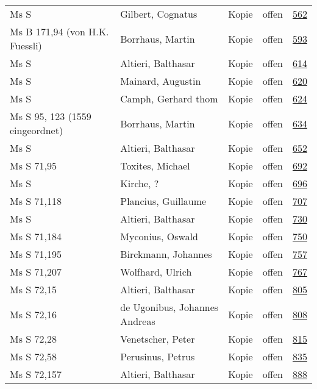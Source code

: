 \documentclass[10pt,a4paper,landscape]{report}
\begin{document}
\begin{longtable}{p{16cm}p{4cm}llr}
Ms S	&	Gilbert, Cognatus	&	Kopie	&	offen	&	\href{http://130.60.24.72/assignment/562}{562}\\
Ms B 171,94 (von H.K. Fuessli)	&	Borrhaus, Martin	&	Kopie	&	offen	&	\href{http://130.60.24.72/assignment/593}{593}\\
Ms S	&	Altieri, Balthasar	&	Kopie	&	offen	&	\href{http://130.60.24.72/assignment/614}{614}\\
Ms S	&	Mainard, Augustin	&	Kopie	&	offen	&	\href{http://130.60.24.72/assignment/620}{620}\\
Ms S	&	Camph, Gerhard thom	&	Kopie	&	offen	&	\href{http://130.60.24.72/assignment/624}{624}\\
Ms S 95, 123 (1559 eingeordnet)	&	Borrhaus, Martin	&	Kopie	&	offen	&	\href{http://130.60.24.72/assignment/634}{634}\\
Ms S	&	Altieri, Balthasar	&	Kopie	&	offen	&	\href{http://130.60.24.72/assignment/652}{652}\\
Ms S 71,95	&	Toxites, Michael	&	Kopie	&	offen	&	\href{http://130.60.24.72/assignment/692}{692}\\
Ms S	&	Kirche, ?	&	Kopie	&	offen	&	\href{http://130.60.24.72/assignment/696}{696}\\
Ms S 71,118	&	Plancius, Guillaume	&	Kopie	&	offen	&	\href{http://130.60.24.72/assignment/707}{707}\\
Ms S	&	Altieri, Balthasar	&	Kopie	&	offen	&	\href{http://130.60.24.72/assignment/730}{730}\\
Ms S 71,184	&	Myconius, Oswald	&	Kopie	&	offen	&	\href{http://130.60.24.72/assignment/750}{750}\\
Ms S 71,195	&	Birckmann, Johannes	&	Kopie	&	offen	&	\href{http://130.60.24.72/assignment/757}{757}\\
Ms S 71,207	&	Wolfhard, Ulrich	&	Kopie	&	offen	&	\href{http://130.60.24.72/assignment/767}{767}\\
Ms S 72,15	&	Altieri, Balthasar	&	Kopie	&	offen	&	\href{http://130.60.24.72/assignment/805}{805}\\
Ms S 72,16	&	de Ugonibus, Johannes Andreas	&	Kopie	&	offen	&	\href{http://130.60.24.72/assignment/808}{808}\\
Ms S 72,28	&	Venetscher, Peter	&	Kopie	&	offen	&	\href{http://130.60.24.72/assignment/815}{815}\\
Ms S 72,58	&	Perusinus, Petrus	&	Kopie	&	offen	&	\href{http://130.60.24.72/assignment/835}{835}\\
Ms S 72,157	&	Altieri, Balthasar	&	Kopie	&	offen	&	\href{http://130.60.24.72/assignment/888}{888}\\

\end{longtable}
\end{document}
